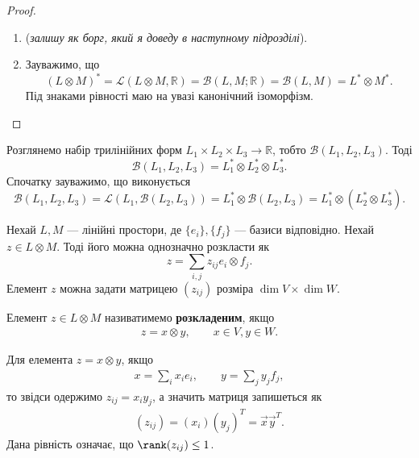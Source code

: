 \documentclass{math_library}
\begin{document}
\begin{proof}
\begin{enumerate}[topsep=0pt,label={\arabic*)},wide=0pt]
\item (\textit{залишу як борг, який я доведу в наступному підрозділі}).

\item Зауважимо, що
\[
(L \otimes M)^* = \mathcal{L}(L \otimes M, \mathbb{R}) = \mathcal{B}(L,M; \mathbb{R}) = \mathcal{B}(L,M) = L^* \otimes M^*.
\]
Під знаками рівності маю на увазі канонічний ізоморфізм. \qedhere
\end{enumerate}
\end{proof}

\begin{remark}
Розглянемо набір трилінійних форм $L_1 \times L_2 \times L_3 \to \mathbb{R}$, тобто $\mathcal{B}(L_1,L_2,L_3)$. Тоді
\[
\mathcal{B}(L_1,L_2,L_3) = L_1^* \otimes L_2^* \otimes L_3^*.
\]
Спочатку зауважимо, що виконується
\[
\mathcal{B}(L_1,L_2,L_3) = \mathcal{L}(L_1, \mathcal{B}(L_2,L_3)) = L_1^* \otimes \mathcal{B}(L_2,L_3) = L_1^* \otimes (L_2^* \otimes L_3^*).
\]
\end{remark}

Нехай $L,M$ --- лінійні простори, де $\{e_i\},\{f_j\}$ --- базиси відповідно. Нехай $z \in L \otimes M$. Тоді його можна однозначно розкласти як
\[
z = \sum_{i,j} z_{ij} e_i \otimes f_j.
\]
Елемент $z$ можна задати матрицею $(z_{ij})$ розміра $\dim V \times \dim W$.

\begin{definition}
Елемент $z \in L \otimes M$ називатимемо \textbf{розкладеним}, якщо
\begin{align*}
z = x \otimes y, \qquad x \in V, y \in W.
\end{align*}
\end{definition}

\begin{remark}
Для елемента $z = x \otimes y$, якщо
\begin{align*}
x = \sum_i x_i e_i, \qquad y = \sum_j y_j f_j,
\end{align*}
то звідси одержимо $z_{ij} = x_i y_j$, а значить матриця запишеться як
\begin{align*}
(z_{ij}) = (x_i) (y_j)^T = \vec{x} \vec{y}^T.
\end{align*}
Дана рівність означає, що $\rank (z_{ij}) \leq 1$.
\end{remark}
\end{document}
